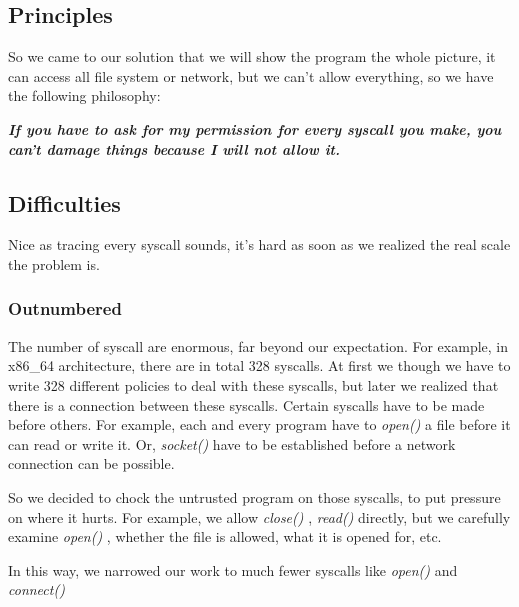 \documentclass[conference,compsoc]{IEEEtran}
\begin{document}
		\subsection{Principles}
			\par
				So we came to our solution that we will show the program the whole picture, it can access all file system or network, but we can't allow everything, so we have the following philosophy:
			\par
				\emph{\textbf{
					If you have to ask for my permission for every syscall you make, you can't damage things because I will not allow it.
				}}
	\subsection{Difficulties}
		\par
			Nice as tracing every syscall sounds, it's hard as soon as we realized the real scale the problem is. 
		\subsubsection{Outnumbered}
			\par 
				The number of syscall are enormous, far beyond our expectation. For example, in x86\_64 architecture, there are in total 328 syscalls. At first we though we have to write 328 different policies to deal with these syscalls, but later we realized that there is a connection between these syscalls. Certain syscalls have to be made before others. For example, each and every program have to \emph{ open() } a file before it can read or write it. Or, \emph{ socket() } have to be established before a network connection can be possible.
			\par
				So we decided to chock the untrusted program on those syscalls, to put pressure on where it hurts. For example, we allow \emph{ close() }, \emph{ read() } directly, but we carefully examine \emph{ open() }, whether the file is allowed, what it is opened for, etc.
			\par 
				In this way, we narrowed our work to much fewer syscalls like \emph{open()} and \emph{connect()}
\end{document}
